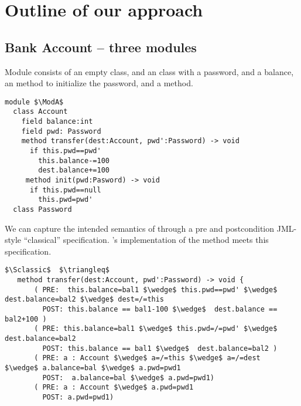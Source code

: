 

\section{Outline of our approach}
\label{s:outline}


 \subsection{Bank Account -- three modules}
\label{s:bank}
  
Module \ModA consists of an empty 
 class, and an   class with a password, and a balance, an  method to 
initialize the password, and 
a
 method. 
%
%
%
%
% 
\begin{lstlisting}[mathescape=true, language=Chainmail, frame=lines]
module $\ModA$
  class Account
    field balance:int 
    field pwd: Password
    method transfer(dest:Account, pwd':Password) -> void
      if this.pwd==pwd'
        this.balance-=100
        dest.balance+=100
     method init(pwd:Pasword) -> void
      if this.pwd==null
        this.pwd=pwd'
  class Password
\end{lstlisting}
%
\noindent 
We can capture the intended
semantics of %
through  a pre and postcondition 
JML-style \cite{Leavens-etal07}  ``classical''
specification.
\ModA's implementation of the  method meets
this specification.



\begin{lstlisting}[mathescape=true, frame=lines, language=Chainmail]
$\Sclassic$  $\triangleq$
   method transfer(dest:Account, pwd':Password) -> void {
       ( PRE:  this.balance=bal1 $\wedge$ this.pwd==pwd' $\wedge$ dest.balance=bal2 $\wedge$ dest=/=this 
         POST: this.balance == bal1-100 $\wedge$  dest.balance == bal2+100 )
       ( PRE: this.balance=bal1 $\wedge$ this.pwd=/=pwd' $\wedge$ dest.balance=bal2
         POST: this.balance == bal1 $\wedge$  dest.balance=bal2 )
       ( PRE: a : Account $\wedge$ a=/=this $\wedge$ a=/=dest  $\wedge$ a.balance=bal $\wedge$ a.pwd=pwd1
         POST:  a.balance=bal $\wedge$ a.pwd=pwd1)
       ( PRE: a : Account $\wedge$ a.pwd=pwd1  
         POST: a.pwd=pwd1)       
\end{lstlisting}
 
